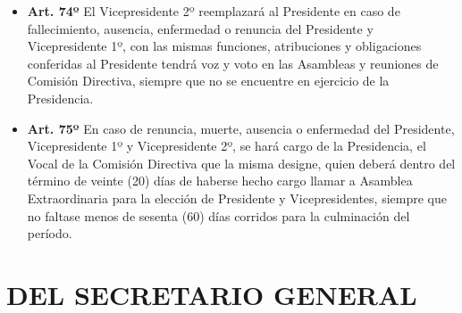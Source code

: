 \documentclass[]{book}
\providecommand{\tightlist}{%
  \setlength{\itemsep}{0pt}\setlength{\parskip}{0pt}}
\begin{document}
\begin{itemize}
\tightlist
\item
  \textbf{Art. 74º}
  El Vicepresidente 2º reemplazará al Presidente en caso de fallecimiento, ausencia, enfermedad o renuncia del Presidente y Vicepresidente 1º, con las mismas funciones, atribuciones y obligaciones conferidas al Presidente tendrá voz y voto en las Asambleas y reuniones de Comisión Directiva, siempre que no se encuentre en ejercicio de la Presidencia.
\end{itemize}

\begin{itemize}
\tightlist
\item
  \textbf{Art. 75º}
  En caso de renuncia, muerte, ausencia o enfermedad del Presidente, Vicepresidente 1º y Vicepresidente 2º, se hará cargo de la Presidencia, el Vocal de la Comisión Directiva que la misma designe, quien deberá dentro del término de veinte (20) días de haberse hecho cargo llamar a Asamblea Extraordinaria para la elección de Presidente y Vicepresidentes, siempre que no faltase menos de sesenta (60) días corridos para la culminación del período.
\end{itemize}

\hypertarget{cap11}{%
\chapter{DEL SECRETARIO GENERAL}\label{cap11}}
\end{document}
